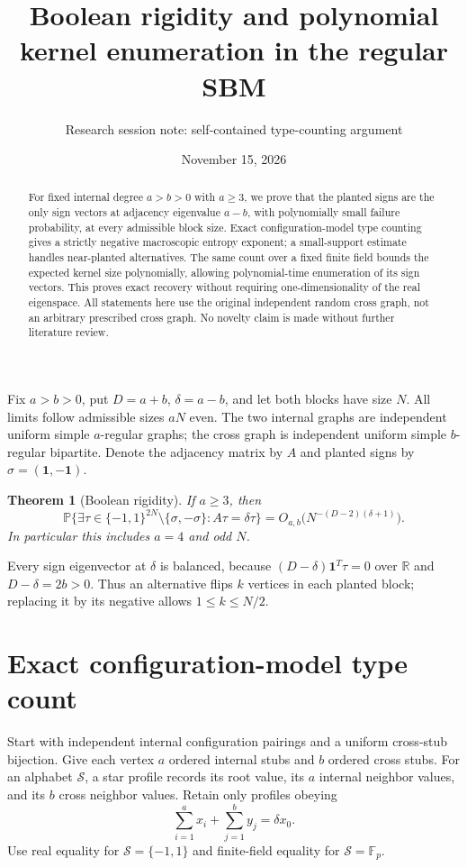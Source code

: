 \documentclass[11pt]{article}
\title{Boolean rigidity and polynomial kernel enumeration in the regular SBM}
\author{Research session note: self-contained type-counting argument}
\date{November 15, 2026}
\newtheorem{theorem}{Theorem}
\newcommand{\one}{\mathbf1}
\newcommand{\Prob}{\mathbb P}
\newcommand{\Fp}{\mathbb F_p}
\begin{document}
\maketitle
\begin{abstract}
For fixed internal degree $a>b>0$ with $a\ge3$, we prove that the planted signs are the only sign vectors at adjacency eigenvalue $a-b$, with polynomially small failure probability, at every admissible block size. Exact configuration-model type counting gives a strictly negative macroscopic entropy exponent; a small-support estimate handles near-planted alternatives. The same count over a fixed finite field bounds the expected kernel size polynomially, allowing polynomial-time enumeration of its sign vectors. This proves exact recovery without requiring one-dimensionality of the real eigenspace. All statements here use the original independent random cross graph, not an arbitrary prescribed cross graph. No novelty claim is made without further literature review.
\end{abstract}

Fix $a>b>0$, put $D=a+b$, $\delta=a-b$, and let both blocks have size $N$. All limits follow admissible sizes $aN$ even. The two internal graphs are independent uniform simple $a$-regular graphs; the cross graph is independent uniform simple $b$-regular bipartite. Denote the adjacency matrix by $A$ and planted signs by $\sigma=(\one,-\one)$.

\begin{theorem}[Boolean rigidity]\label{thm:rigidity}
If $a\ge3$, then
\[
 \Prob\{\exists\tau\in\{-1,1\}^{2N}\setminus\{\sigma,-\sigma\}:
 A\tau=\delta\tau\}
 =O_{a,b}\bigl(N^{-(D-2)(\delta+1)}\bigr).
\]
In particular this includes $a=4$ and odd $N$.
\end{theorem}

Every sign eigenvector at $\delta$ is balanced, because
$(D-\delta)\one^T\tau=0$ over $\mathbb R$ and $D-\delta=2b>0$.
Thus an alternative flips $k$ vertices in each planted block; replacing it by its negative allows $1\le k\le N/2$.

\section{Exact configuration-model type count}
Start with independent internal configuration pairings and a uniform cross-stub bijection. Give each vertex $a$ ordered internal stubs and $b$ ordered cross stubs. For an alphabet $\mathcal S$, a star profile records its root value, its $a$ internal neighbor values, and its $b$ cross neighbor values. Retain only profiles obeying
\begin{equation}\label{eq:local}
 \sum_{i=1}^a x_i+\sum_{j=1}^b y_j=\delta x_0.
\end{equation}
Use real equality for $\mathcal S=\{-1,1\}$ and finite-field equality for $\mathcal S=\Fp$.
\end{document}
